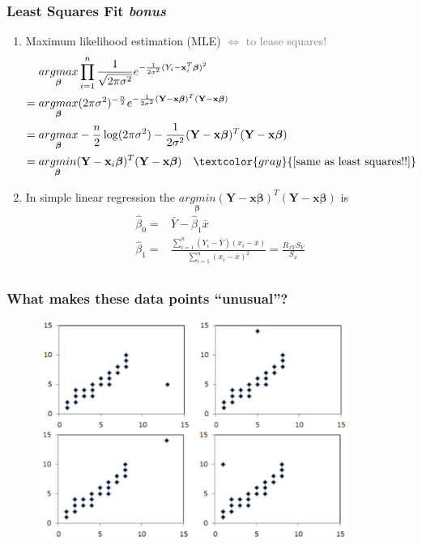 \documentclass[xcolor={dvipsnames}]{beamer}
\begin{document}
\frame
{
 \frametitle{Least Squares Fit \emph{bonus}}
 
 \vspace{.5em}
 
\begin{enumerate}
\item Maximum likelihood estimation (MLE)  \textcolor{gray}{$\iff$ to lease squares!}
\begin{align*}
{} & \underset{{\boldsymbol\beta}}{argmax} \prod_{i=1}^n \frac{1}{\sqrt{2\pi \sigma^2}} e^{-\frac{1}{2\sigma^2}(Y_i-\textbf{x}_i^T{\boldsymbol\beta})^2}\\
= {} & 
\underset{{\boldsymbol\beta}}{argmax} (2\pi \sigma^2)^{-\frac{n}{2}} e^{-\frac{1}{2\sigma^2}(\textbf{Y} - \textbf{x}{\boldsymbol\beta})^T(\textbf{Y} - \textbf{x}{\boldsymbol\beta})}\\
= {} & 
\underset{{\boldsymbol\beta}}{argmax} -\frac{n}{2}\log(2\pi \sigma^2) -\frac{1}{2\sigma^2}(\textbf{Y} - \textbf{x}{\boldsymbol\beta})^T(\textbf{Y} - \textbf{x}{\boldsymbol\beta})\\
= {} & 
\underset{{\boldsymbol\beta}}{argmin} (\textbf{Y} - \textbf{x}_i{\boldsymbol\beta})^T(\textbf{Y} - \textbf{x}{\boldsymbol\beta}) \quad \textcolor{gray}{\text{[same as least squares!!]}}
\end{align*} 
\item In simple linear regression the $\underset{{\boldsymbol\beta}}{argmin}  (\textbf{Y} - \textbf{x}{\boldsymbol\beta})^T(\textbf{Y} - \textbf{x}{\boldsymbol\beta})$ is
\begin{align*}
\hat \beta_0 = {}& \bar Y -  \hat \beta_1 \bar x \\
\hat \beta_1 = {}& \frac{\sum_{i=1}^n (Y_i - \bar Y) (x_i - \bar x)}{\sum_{i=1}^n (x_i - \bar x)^2} = \frac{R_{xY}S_Y}{S_x}\\
\end{align*}
\end{enumerate}
}


\frame
{
 \frametitle{What makes these data points ``unusual''?}

\begin{figure}
\centering
\includegraphics[width=4in]{stuff/outliers2.png}
\end{figure}
}
\end{document}
